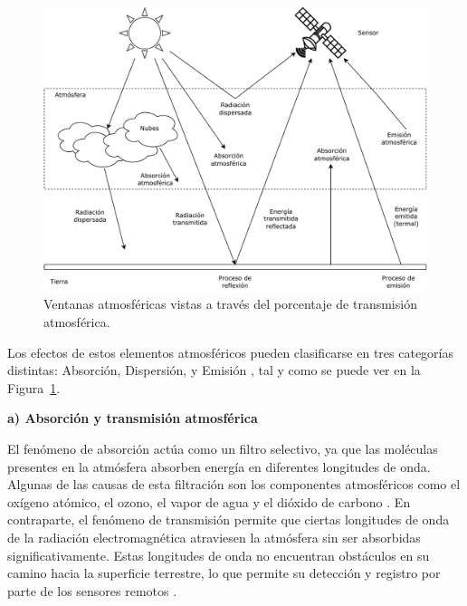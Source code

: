 \begin{figure}[H]
    \begin{center}
        \includegraphics[width=1\textwidth]{Images/InteraccionAtmosfera.pdf}
    \end{center}
    \caption{Ventanas atmosféricas vistas a través del porcentaje de transmisión atmosférica.}
    \label{fig:InteraccionAtmosfera}
\end{figure}

Los efectos de estos elementos atmosféricos pueden clasificarse en tres categorías distintas: Absorción, Dispersión, y Emisión \cite{chuvieco2016fundamentals}, tal y como se puede ver en la Figura~\ref{fig:InteraccionAtmosfera}.

\textbf{a) Absorción y transmisión atmosférica}

El fenómeno de absorción actúa como un filtro selectivo, ya que las moléculas presentes en la atmósfera absorben energía en diferentes longitudes de onda. Algunas de las causas de esta filtración son los componentes atmosféricos como el oxígeno atómico, el ozono, el vapor de agua y el dióxido de carbono \cite{chuvieco2016fundamentals}. En contraparte, el fenómeno de transmisión permite que ciertas longitudes de onda de la radiación electromagnética atraviesen la atmósfera sin ser absorbidas significativamente. Estas longitudes de onda no encuentran obstáculos en su camino hacia la superficie terrestre, lo que permite su detección y registro por parte de los sensores remotos \cite{canada2007fundamentals}.

